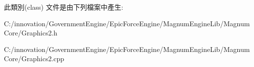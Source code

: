 此類別(class) 文件是由下列檔案中產生\+:\begin{DoxyCompactItemize}
\item 
C\+:/innovation/\+Government\+Engine/\+Epic\+Force\+Engine/\+Magnum\+Engine\+Lib/\+Magnum\+Core/Graphics2.\+h\item 
C\+:/innovation/\+Government\+Engine/\+Epic\+Force\+Engine/\+Magnum\+Engine\+Lib/\+Magnum\+Core/Graphics2.\+cpp\end{DoxyCompactItemize}
